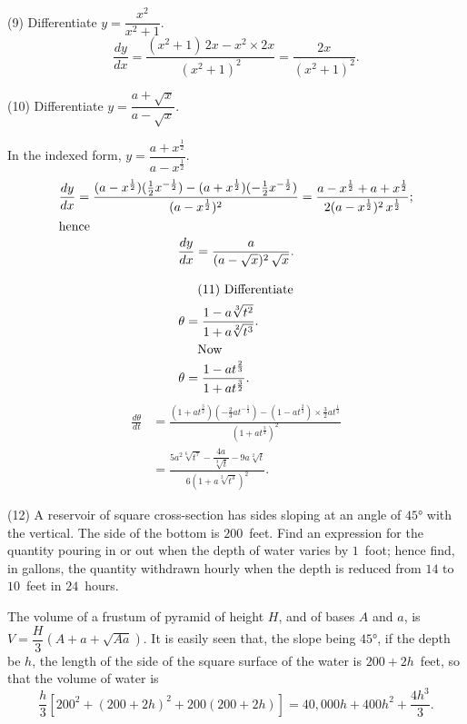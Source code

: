 \documentclass[12pt]{book}[2005/09/16]
\newcommand{\DPPageSep}[2]{\Pagelabel{#2}}
\newcommand{\Pagelabel}[1]
  {\phantomsection\label{#1}}
\newcommand{\DPtypo}[2]{#2}%
\newcommand{\efrac}[2]{\frac{#1}{#2}}
\begin{document}
(9) Differentiate $y = \dfrac{x^2}{x^2 + 1}$.
\[
\dfrac{dy}{dx} = \dfrac{(x^2 + 1)\, 2x - x^2 × 2x}{(x^2 + 1)^2} = \dfrac{2x}{(x^2 + 1)^2}.
\]

(10) Differentiate $y = \dfrac{a + \sqrt{x}}{a - \sqrt{x}}$.

In the indexed form, $y = \dfrac{a + x^{\efrac{1}{2}}}{a - x^{\efrac{1}{2}}}$.
\begin{gather*}
\frac{dy}{dx}
  = \frac{(a - x^{\efrac{1}{2}})( \tfrac{1}{2} x^{-\efrac{1}{2}})
        - (a + x^{\efrac{1}{2}})(-\tfrac{1}{2} x^{-\efrac{1}{2}})}
         {(a - x^{\efrac{1}{2}})^2}
  = \frac{ a - x^{\efrac{1}{2}}
         + a + x^{\efrac{1}{2}}}
        {2(a - x^{\efrac{1}{2}})^2\, x^{\efrac{1}{2}}}; \\
\intertext{\rlap{hence}}
\frac{dy}{dx} = \frac{a}{(a - \sqrt{x})^2\, \sqrt{x}}.
\end{gather*}

\begin{align*}
\intertext{\indent (11) Differentiate}
\theta &= \frac{1 - a \sqrt[3]{t^2}}{1 + a \sqrt[2]{t^3}}. \\
\intertext{\indent Now}
\theta &= \frac{1 - at^{\efrac{2}{3}}}{1 + at^{\efrac{3}{2}}}.
\end{align*}
\begin{align*}
\frac{d\theta}{dt}
  &= \frac{(1 + at^{\efrac{3}{2}}) (-\tfrac{2}{3} at^{-\efrac{1}{3}})
         - (1 - at^{\efrac{2}{3}}) × \tfrac{3}{2} at^{\efrac{1}{2}}}
          {(1 + at^{\efrac{3}{2}})^2} \\
  &= \frac{5a^2 \sqrt[6]{t^7} - \dfrac{4a}{\sqrt[3]{t}} - 9a \sqrt[2]{t}}
          {6(1 + a \sqrt[2]{\DPtypo{3}{t^3}})^2}.
\end{align*}

(12) A reservoir of square cross-section has sides
sloping at an angle of $45°$ with the vertical. The side
\DPPageSep{057.png}{45}%
of the bottom is $200$~feet. Find an expression for the
quantity pouring in or out when the depth of water
varies by $1$~foot; hence find, in gallons, the quantity
withdrawn hourly when the depth is reduced from
$14$ to $10$~feet in $24$~hours.

The volume of a frustum of pyramid of height $H$,
and of bases $A$ and $a$, is $V = \dfrac{H}{3} (A + a + \sqrt{Aa} )$. It is
easily seen that, the slope being $45°$, if the depth be
$h$, the length of the side of the square surface of the
water is $200 + 2h$~feet, so that the volume of water is
\[
\dfrac{h}{3} [200^2 + (200 + 2h)^2 + 200(200 + 2h)]
= 40,000h + 400h^2 + \dfrac{4h^3}{3}.
\]
\end{document}
